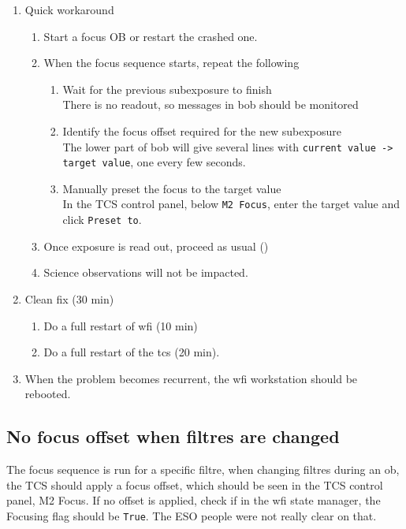 \documentclass[11pt,fleqn,a4paper]{book}
\begin{document}
\label{proc:wfifocseqtimeout}
\begin{enumerate}
    \item Quick workaround
    \begin{enumerate}
        \item Start a focus OB or restart the crashed one.
        \item When the focus sequence starts, repeat the following
        \begin{enumerate}
            \item Wait for the previous subexposure to finish\\
                  There is no readout, so messages in bob should be monitored
            \item Identify the focus offset required for the new subexposure\\
                  The lower part of \gls{bob} will give several lines with
                  \texttt{current value -> target value}, one every few seconds.
            \item Manually preset the focus to the target value\\ 
                  In the \gls{TCS control panel}, below \texttt{M2 Focus}, enter the target value and click \texttt{Preset to}.  
        \end{enumerate}
        \item Once exposure is read out, proceed as usual ()
        \item Science observations will not be impacted.
    \end{enumerate}
    \item Clean fix (30 min)
    \begin{enumerate}
        \item Do a full restart of \gls{wfi} (10 min)
        \item Do a full restart of the \gls{tcs} (20 min).
    \end{enumerate}
   \item When the problem becomes recurrent, the \gls{wfi} workstation should
be rebooted.
\end{enumerate}

\subsection{No focus offset when filtres are changed}
\label{sec:filfocoffset}
The \gls{focus} sequence is run for a specific filtre, when changing filtres during an \gls{ob}, the TCS should apply a focus offset, which should be seen in the \gls{TCS control panel}, M2 Focus. If no offset is applied, check if in the \gls{wfi} \gls{state manager}, the Focusing flag should be \texttt{True}. The ESO people were not really clear on that.
\end{document}
